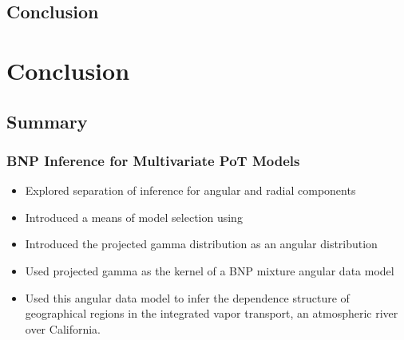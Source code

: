 \documentclass[aspectratio=169,10pt]{beamer}
\begin{document}
\subsection{Conclusion}

\section{Conclusion}

\subsection{Summary}

\begin{frame}
    \frametitle{BNP Inference for Multivariate PoT Models}
    \begin{itemize}
        \item Explored separation of inference for angular and radial components
        \item Introduced a means of model selection using 
        \item Introduced the projected gamma distribution as an angular distribution
        \item Used projected gamma as the kernel of a BNP mixture angular data model
        \item Used this angular data model to infer the dependence structure of geographical
            regions in the integrated vapor transport, an atmospheric river over California.
    \end{itemize}
\end{frame}
\end{document}
